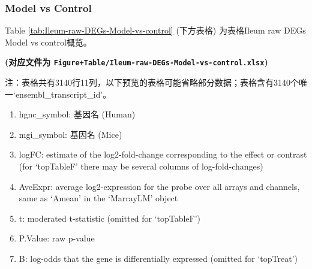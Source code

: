\documentclass[
]{article}
\providecommand{\tightlist}{%
  \setlength{\itemsep}{0pt}\setlength{\parskip}{0pt}}
\begin{document}
\hypertarget{model-vs-control-1}{%
\subsubsection{Model vs Control}\label{model-vs-control-1}}

Table \ref{tab:Ileum-raw-DEGs-Model-vs-control} (下方表格) 为表格Ileum raw DEGs Model vs control概览。

\textbf{(对应文件为 \texttt{Figure+Table/Ileum-raw-DEGs-Model-vs-control.xlsx})}

\begin{center}\begin{tcolorbox}[colback=gray!10, colframe=gray!50, width=0.9\linewidth, arc=1mm, boxrule=0.5pt]注：表格共有3140行11列，以下预览的表格可能省略部分数据；表格含有3140个唯一`ensembl\_transcript\_id'。
\end{tcolorbox}
\end{center}
\begin{center}\begin{tcolorbox}[colback=gray!10, colframe=gray!50, width=0.9\linewidth, arc=1mm, boxrule=0.5pt]\begin{enumerate}\tightlist
\item hgnc\_symbol:  基因名 (Human)
\item mgi\_symbol:  基因名 (Mice)
\item logFC:  estimate of the log2-fold-change corresponding to the effect or contrast (for ‘topTableF’ there may be several columns of log-fold-changes)
\item AveExpr:  average log2-expression for the probe over all arrays and channels, same as ‘Amean’ in the ‘MarrayLM’ object
\item t:  moderated t-statistic (omitted for ‘topTableF’)
\item P.Value:  raw p-value
\item B:  log-odds that the gene is differentially expressed (omitted for ‘topTreat’)
\end{enumerate}\end{tcolorbox}
\end{center}
\end{document}
